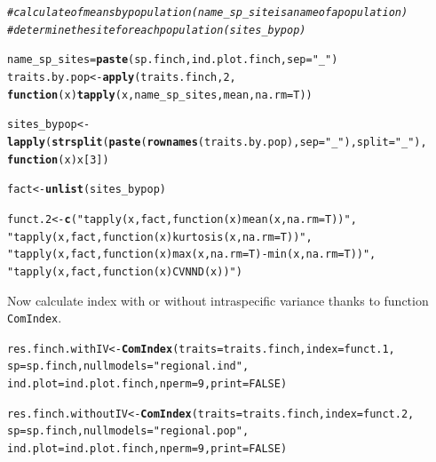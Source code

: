 \documentclass[12pt]{article}\usepackage[]{graphicx}\usepackage[]{color}
\makeatletter
\newcommand{\hlnum}[1]{\textcolor[rgb]{0.686,0.059,0.569}{#1}}%
\newcommand{\hlstr}[1]{\textcolor[rgb]{0.192,0.494,0.8}{#1}}%
\newcommand{\hlcom}[1]{\textcolor[rgb]{0.678,0.584,0.686}{\textit{#1}}}%
\newcommand{\hlstd}[1]{\textcolor[rgb]{0.345,0.345,0.345}{#1}}%
\newcommand{\hlkwa}[1]{\textcolor[rgb]{0.161,0.373,0.58}{\textbf{#1}}}%
\newcommand{\hlkwb}[1]{\textcolor[rgb]{0.69,0.353,0.396}{#1}}%
\newcommand{\hlkwc}[1]{\textcolor[rgb]{0.333,0.667,0.333}{#1}}%
\newcommand{\hlkwd}[1]{\textcolor[rgb]{0.737,0.353,0.396}{\textbf{#1}}}%
\newenvironment{kframe}{%
 \def\at@end@of@kframe{}%
 \ifinner\ifhmode%
  \def\at@end@of@kframe{\end{minipage}}%
  \begin{minipage}{\columnwidth}%
 \fi\fi%
 \def\FrameCommand##1{\hskip\@totalleftmargin \hskip-\fboxsep
 \colorbox{shadecolor}{##1}\hskip-\fboxsep
     \hskip-\linewidth \hskip-\@totalleftmargin \hskip\columnwidth}%
 \MakeFramed {\advance\hsize-\width
   \@totalleftmargin\z@ \linewidth\hsize
   \@setminipage}}%
 {\par\unskip\endMakeFramed%
 \at@end@of@kframe}
\newenvironment{knitrout}{}{} %
\makeatother
\begin{document}
\begin{knitrout}
\color{fgcolor}\begin{kframe}
\begin{alltt}
\hlcom{#calculate  of means by population (name_sp_site is a name of a population) }
\hlcom{#determine the site for each population (sites_bypop)}

\hlstd{name_sp_sites} \hlkwb{=} \hlkwd{paste}\hlstd{(sp.finch, ind.plot.finch,} \hlkwc{sep} \hlstd{=} \hlstr{"_"}\hlstd{)}
\hlstd{traits.by.pop}\hlkwb{<-}\hlkwd{apply}\hlstd{(traits.finch,} \hlnum{2} \hlstd{,}
           \hlkwa{function} \hlstd{(}\hlkwc{x}\hlstd{)} \hlkwd{tapply}\hlstd{(x, name_sp_sites, mean ,} \hlkwc{na.rm} \hlstd{= T))}

\hlstd{sites_bypop}\hlkwb{<-}\hlkwd{lapply}\hlstd{(}\hlkwd{strsplit}\hlstd{(}\hlkwd{paste}\hlstd{(}\hlkwd{rownames}\hlstd{(traits.by.pop),} \hlkwc{sep} \hlstd{=} \hlstr{"_"}\hlstd{),} \hlkwc{split} \hlstd{=} \hlstr{"_"}\hlstd{),}
          \hlkwa{function}\hlstd{(}\hlkwc{x}\hlstd{) x[}\hlnum{3}\hlstd{])}

\hlstd{fact}\hlkwb{<-}\hlkwd{unlist}\hlstd{(sites_bypop)}

\hlstd{funct.2}\hlkwb{<-}\hlkwd{c}\hlstd{(}\hlstr{"tapply(x, fact, function(x) mean(x, na.rm = T))"}\hlstd{,}
          \hlstr{"tapply(x, fact, function(x) kurtosis(x, na.rm = T))"}\hlstd{,}
          \hlstr{"tapply(x, fact, function(x) max(x, na.rm = T)-min(x, na.rm = T))"}\hlstd{,}
          \hlstr{"tapply(x, fact, function(x) CVNND(x))"}\hlstd{)}
\end{alltt}
\end{kframe}
\end{knitrout}

Now calculate index with or without intraspecific variance thanks to function \texttt{ComIndex}.
\begin{knitrout}
\color{fgcolor}\begin{kframe}
\begin{alltt}
\hlstd{res.finch.withIV}\hlkwb{<-}\hlkwd{ComIndex}\hlstd{(}\hlkwc{traits} \hlstd{= traits.finch,} \hlkwc{index} \hlstd{= funct.1,}
               \hlkwc{sp} \hlstd{= sp.finch,} \hlkwc{nullmodels} \hlstd{=} \hlstr{"regional.ind"}\hlstd{,}
               \hlkwc{ind.plot} \hlstd{= ind.plot.finch,} \hlkwc{nperm} \hlstd{=} \hlnum{9}\hlstd{,} \hlkwc{print} \hlstd{=} \hlnum{FALSE}\hlstd{)}

\hlstd{res.finch.withoutIV}\hlkwb{<-}\hlkwd{ComIndex}\hlstd{(}\hlkwc{traits} \hlstd{= traits.finch,} \hlkwc{index} \hlstd{= funct.2,}
               \hlkwc{sp} \hlstd{= sp.finch,} \hlkwc{nullmodels} \hlstd{=} \hlstr{"regional.pop"}\hlstd{,}
               \hlkwc{ind.plot} \hlstd{= ind.plot.finch,} \hlkwc{nperm} \hlstd{=} \hlnum{9}\hlstd{,} \hlkwc{print} \hlstd{=} \hlnum{FALSE}\hlstd{)}
\end{alltt}
\end{kframe}
\end{knitrout}
\end{document}
